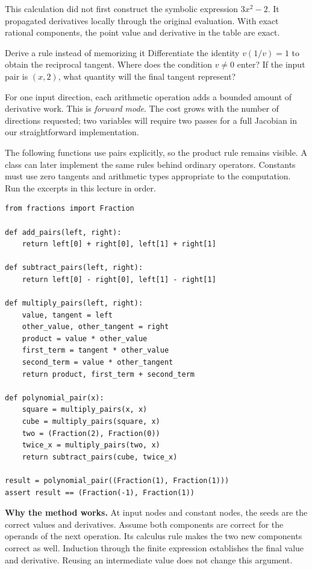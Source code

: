 This calculation did not first construct the symbolic expression $3x^2-2$.
It propagated derivatives locally through the original evaluation. With exact
rational components, the point value and derivative in the table are exact.

\begin{question}{Derive a rule instead of memorizing it}
Differentiate the identity $v(1/v)=1$ to obtain the reciprocal tangent.
Where does the condition $v\ne0$ enter? If the input pair is $(x,2)$,
what quantity will the final tangent represent?
\end{question}

For one input direction, each arithmetic operation adds a bounded amount of
derivative work. This is \emph{forward mode}. The cost grows with the number
of directions requested; two variables will require two passes for a full
Jacobian in our straightforward implementation.

\newpage
{}
The following functions use pairs explicitly, so the product rule remains
visible. A class can later implement the same rules behind ordinary operators.
Constants must use zero tangents and arithmetic types appropriate to the
computation. Run the excerpts in this lecture in order.
\begin{lstlisting}
from fractions import Fraction

def add_pairs(left, right):
    return left[0] + right[0], left[1] + right[1]

def subtract_pairs(left, right):
    return left[0] - right[0], left[1] - right[1]

def multiply_pairs(left, right):
    value, tangent = left
    other_value, other_tangent = right
    product = value * other_value
    first_term = tangent * other_value
    second_term = value * other_tangent
    return product, first_term + second_term

def polynomial_pair(x):
    square = multiply_pairs(x, x)
    cube = multiply_pairs(square, x)
    two = (Fraction(2), Fraction(0))
    twice_x = multiply_pairs(two, x)
    return subtract_pairs(cube, twice_x)

result = polynomial_pair((Fraction(1), Fraction(1)))
assert result == (Fraction(-1), Fraction(1))
\end{lstlisting}

\textbf{Why the method works.} At input nodes and constant nodes, the seeds
are the correct values and derivatives. Assume both components are correct
for the operands of the next operation. Its calculus rule makes the two
new components correct as well. Induction through the finite expression
establishes the final value and derivative. Reusing an intermediate value
does not change this argument.

